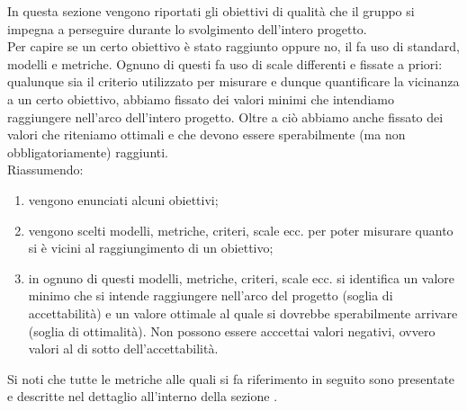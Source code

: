 	 \label{sec:obiettivi}
		In questa sezione vengono riportati gli obiettivi di qualità che il gruppo \groupname{} si impegna a perseguire durante lo svolgimento dell'intero progetto.\\
		Per capire se un certo obiettivo è stato raggiunto oppure no, il \groupname{} fa uso di standard, modelli e metriche. Ognuno di questi fa uso di scale differenti e fissate a priori: qualunque sia il criterio utilizzato per misurare e dunque quantificare la vicinanza a un certo obiettivo, abbiamo fissato dei valori minimi che intendiamo raggiungere nell'arco dell'intero progetto. Oltre a ciò abbiamo anche fissato dei valori che riteniamo ottimali e che devono essere sperabilmente (ma non obbligatoriamente) raggiunti.\\
		Riassumendo:
		\begin{enumerate}
			\item vengono enunciati alcuni obiettivi;
			\item vengono scelti modelli, metriche, criteri, scale ecc. per poter misurare quanto si è vicini al raggiungimento di un obiettivo;
			\item in ognuno di questi modelli, metriche, criteri, scale ecc. si identifica un valore minimo che si intende raggiungere nell'arco del progetto (soglia di accettabilità) e un valore ottimale al quale si dovrebbe sperabilmente arrivare (soglia di ottimalità). Non possono essere acccettai valori negativi, ovvero valori al di sotto dell'accettabilità. 
		\end{enumerate}
		Si noti che tutte le metriche alle quali si fa riferimento in seguito sono presentate e descritte nel dettaglio all'interno della sezione .

